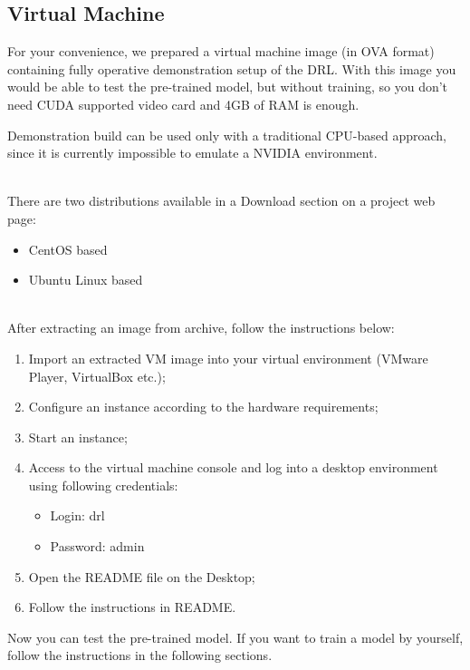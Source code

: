 \documentclass[a4paper,oneside,dvipsnames]{article}
\begin{document}
\subsection[Virtual Machine]{Virtual Machine}
For your convenience, we prepared a virtual machine image (in OVA format) containing fully operative demonstration setup of the DRL. With this image you would be able to test the pre-trained model, but without training, so you don't need CUDA supported video card and 4GB of RAM is enough. \\

\begin{tcolorbox}[colbacktitle=red!40!white, coltitle=black, width=\linewidth, fonttitle=\bfseries, title=Note]
Demonstration build can be used only with a traditional CPU-based approach, since it is currently impossible to emulate a NVIDIA environment.
\end{tcolorbox}

\noindent
\\ There are two distributions available in a Download section on a project web page:
\begin{itemize}
    \item CentOS based
    \item Ubuntu Linux based
\end{itemize}

\noindent
\\ After extracting an image from archive, follow the instructions below:
\begin{enumerate}
    \item Import an extracted VM image into your virtual environment (VMware Player, VirtualBox etc.);
    \item Configure an instance according to the hardware requirements;
    \item Start an instance;
    \item Access to the virtual machine console and log into a desktop environment using following credentials:
        \begin{itemize}
            \item Login: drl
            \item Password: admin
        \end{itemize}
    \item Open the README file on the Desktop;
    \item Follow the instructions in README.
\end{enumerate}

\noindent
Now you can test the pre-trained model. If you want to train a model by yourself, follow the instructions in the following sections.
\end{document}
